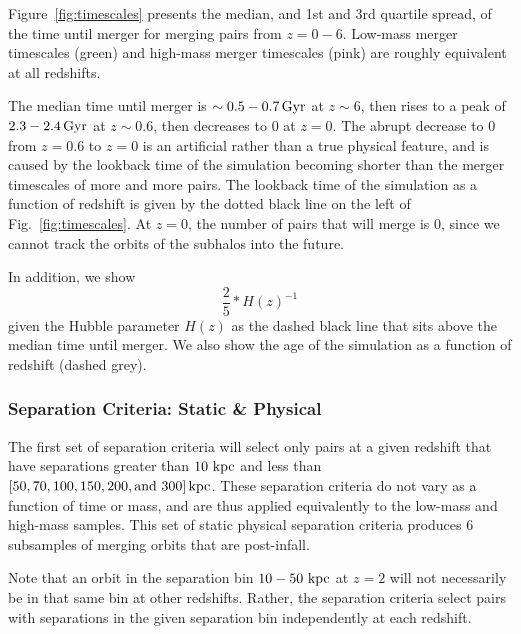 \documentclass[twocolumn,linenumbers]{aastex631}
\begin{document}
Figure~\ref{fig:timescales} presents the median, and 1st and 3rd quartile spread, of the time until merger for merging pairs from $z=0-6$. 
Low-mass merger timescales (green) and high-mass merger timescales (pink) are roughly equivalent at all redshifts. 

The median time until merger is $\sim0.5-0.7\,\mathrm{Gyr}$ at $z\sim6$, then rises to a peak of $2.3-2.4\,\mathrm{Gyr}$ at $z\sim0.6$, then decreases to 0 at $z=0$.
The abrupt decrease to 0 from $z=0.6$ to $z=0$ is an artificial rather than a true physical feature, and is caused by the lookback time of the simulation becoming shorter than the merger timescales of more and more pairs. 
The lookback time of the simulation as a function of redshift is given by the dotted black line on the left of Fig.~\ref{fig:timescales}.
At $z=0$, the number of pairs that will merge is 0, since we cannot track the orbits of the subhalos into the future.

In addition, we show 
\begin{equation}
\frac{2}{5}*H(z)^{-1}
\end{equation}
given the Hubble parameter $H(z)$ as the dashed black line that sits above the median time until merger.
We also show the age of the simulation as a function of redshift (dashed grey).

\subsubsection{Separation Criteria: Static \& Physical }
The first set of separation criteria will select only pairs at a given redshift that have separations greater than $10\,\mathrm{\,kpc}$ and less than $[50, 70, 100, 150, 200, \mbox{and }300]\mathrm{\,kpc}$. 
These separation criteria do not vary as a function of time or mass, and are thus applied equivalently to the low-mass and high-mass samples. 
This set of static physical separation criteria produces 6 subsamples of merging orbits that are post-infall. 

Note that an orbit in the separation bin $10-50\,\mathrm{\,kpc}$ at $z=2$ will not necessarily be in that same bin at other redshifts. 
Rather, the separation criteria select pairs with separations in the given separation bin independently at each redshift. 
\end{document}

